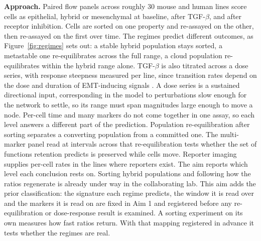 \documentclass[12pt,letterpaper]{article}
\newcommand{\chg}[1]{\textcolor{chgcolor}{#1}}
\newcommand{\chg}[1]{#1}
\newcommand{\lead}[1]{\textbf{#1}}
\begin{document}
\lead{Approach.} Paired flow panels across roughly 30 mouse and human lines score cells as epithelial, hybrid or mesenchymal at baseline, after TGF-$\beta$, and after receptor inhibition. Cells are sorted on one property and re-assayed on the other, then re-assayed on the first over time. The regimes predict different outcomes, as Figure~\ref{fig:regimes} sets out: a stable hybrid population stays sorted, a metastable one re-equilibrates across the full range, a cloud population re-equilibrates within the hybrid range alone. TGF-$\beta$ is also titrated across a dose series, with response steepness measured per line, since transition rates depend on the dose and duration of EMT-inducing signals \cite{subhadarshini2023}. A dose series is a sustained directional input, corresponding in the model to perturbations slow enough for the network to settle, so its range must span magnitudes large enough to move a node. \chg{Per-cell time and many markers do not come together in one assay, so each level answers a different part of the prediction. Population re-equilibration after sorting separates a converting population from a committed one. The multi-marker panel read at intervals across that re-equilibration tests whether the set of functions retention predicts is preserved while cells move. Reporter imaging supplies per-cell rates in the lines where reporters exist. The aim reports which level each conclusion rests on.} Sorting hybrid populations and following how the ratios regenerate is already under way in the collaborating lab. This aim adds the prior classification: \chg{the signature each regime predicts, the window it is read over and the markers it is read on are fixed in Aim 1 and registered before any re-equilibration or dose-response result is examined.} A sorting experiment on its own measures how fast ratios return. With \chg{that mapping} registered in advance it tests whether the regimes are real.
\end{document}
